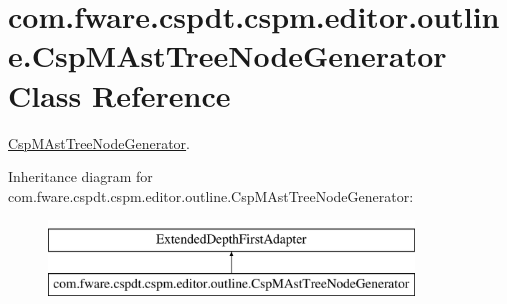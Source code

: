 \hypertarget{classcom_1_1fware_1_1cspdt_1_1cspm_1_1editor_1_1outline_1_1_csp_m_ast_tree_node_generator}{}\section{com.\+fware.\+cspdt.\+cspm.\+editor.\+outline.\+Csp\+M\+Ast\+Tree\+Node\+Generator Class Reference}
\label{classcom_1_1fware_1_1cspdt_1_1cspm_1_1editor_1_1outline_1_1_csp_m_ast_tree_node_generator}


\hyperlink{classcom_1_1fware_1_1cspdt_1_1cspm_1_1editor_1_1outline_1_1_csp_m_ast_tree_node_generator}{Csp\+M\+Ast\+Tree\+Node\+Generator}.  


Inheritance diagram for com.\+fware.\+cspdt.\+cspm.\+editor.\+outline.\+Csp\+M\+Ast\+Tree\+Node\+Generator\+:\begin{figure}[H]
\begin{center}
\leavevmode
\includegraphics[height=2.000000cm]{classcom_1_1fware_1_1cspdt_1_1cspm_1_1editor_1_1outline_1_1_csp_m_ast_tree_node_generator}
\end{center}
\end{figure}
